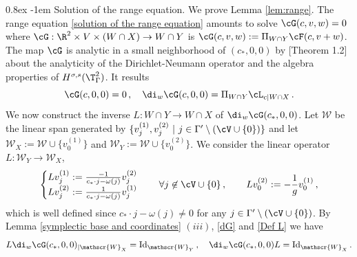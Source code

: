 \documentclass[11pt,a4paper,reqno]{article}
\makeatletter
\renewcommand{\paragraph}{%
  \@startsection{paragraph}{4}{\z@}%
  {0.8ex}  %
  {-1em}   %
  {\normalfont\bfseries}%
}
\numberwithin{equation}{section}
\theoremstyle{definition}
\makeatother
\begin{document}
\begin{appendix}
        \paragraph{Solution of the range equation.} 
       We  prove Lemma \ref{lem:range}.
    The range equation \eqref{solution of the range equation} amounts to solve 
$ \cG(c,v,w) = 0 $ where 
$\cG:\R^2\times 
    V\times (W\cap X) \to W\cap Y $ is 
    $
    \cG(c,v,w):= \Pi_{W\cap Y}\cF(c,v+w) $.
The map $ \cG $ is analytic in a small neighborhood of 
$ (c_*,0,0) $ by  \cite{BMV2}[Theorem 1.2]
about the analyticity  of the Dirichlet-Neumann operator 
and the algebra properties of $H^{\sigma,s}(\T^2_\Gamma)$. 
It results  
\begin{equation}\label{dG}
        \cG(c,0,0) = 0 \, , \quad  \di_w\cG(c,0,0)=\Pi_{W\cap Y}\cL_{c|W\cap X}\, .
    \end{equation}
    We now  construct the inverse $L : W\cap Y\to W\cap X $ of  $\di_w\cG(c_*,0,0) $.
    Let $\mathscr{W}$ be the linear span generated by $\{v_j^{(1)},v_j^{(2)} \ |\ j \in \Gamma'\setminus(\cV\cup\{0\})\}$ and let $\mathscr{W}_X:=\mathscr{W}\cup\{v_0^{(1)} \}$ and $\mathscr{W}_Y:=\mathscr{W}\cup\{v_0^{(2)}\}$.
    We consider  the linear operator $L:\mathscr{W}_Y\to \mathscr{W}_X$,  
    \begin{equation}\label{Def L}
        \begin{cases}
            L v_j^{(1)}:=\frac{-1}{c_*\cdot j-\omega(j)} v_j^{(2)}\\
            L v_j^{(2)}:=\frac{1}{c_*\cdot j-\omega(j)} v_j^{(1)}
        \end{cases}\quad \forall j \not \in \cV\cup \{0\} \, , \qquad  Lv_0^{(2)}:=-\frac1g v_0^{(1)}\, ,
    \end{equation}
which is well defined since $c_*\cdot j - \omega (j) \neq 0 $ for any $j\in \Gamma'\setminus (\cV\cup \{0\})$. 
    By Lemma \ref{symplectic base and coordinates} $(iii)$, \eqref{dG} and \eqref{Def L} we have
    \begin{equation}\label{L is an inverse}
            L \di_w\cG(c_*,0,0)_{|\mathscr{W}_X}= \text{Id}_{\mathscr{W}_Y}
            \, , \quad 
            \di_w\cG(c_*,0,0)  L= \text{Id}_{\mathscr{W}_X}\, .
    \end{equation}
   

\end{appendix}
\end{document}

